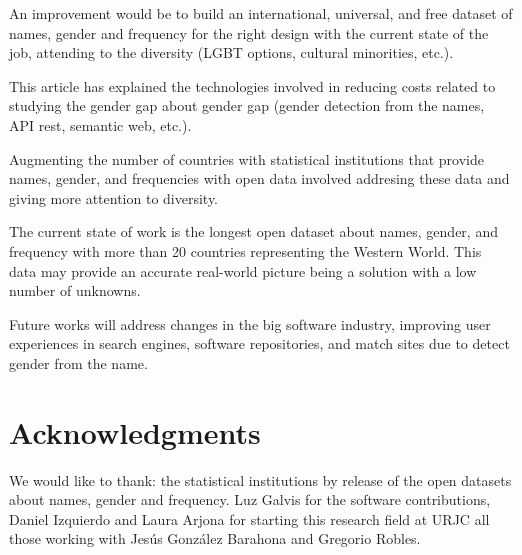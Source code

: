 \documentclass[a4paper]{article}
\begin{document}
An improvement would be to build an international, universal, and free
dataset of names, gender and frequency for the right design with
the current state of the job, attending to the diversity (LGBT
options, cultural minorities, etc.).

This article has explained the technologies involved in reducing costs
related to studying the gender gap about gender gap (gender detection
from the names, API rest, semantic web, etc.).

Augmenting the number of countries with statistical institutions
that provide names, gender, and frequencies with open data
involved addresing these data and giving more attention to
diversity.

The current state of work is the longest open dataset about names,
gender, and frequency with more than 20 countries representing the
Western World. This data may provide an accurate real-world picture
being a solution with a low number of unknowns.

Future works will address changes in the big software industry,
improving user experiences in search engines, software repositories,
and match sites due to detect gender from the name.


\section*{Acknowledgments}

We would like to thank: the statistical institutions by
release of the open datasets about names, gender and frequency.
Luz Galvis for the software contributions, Daniel Izquierdo and
Laura Arjona for starting this research field at URJC all those
working with Jesús González Barahona and Gregorio Robles. 



\end{document}
